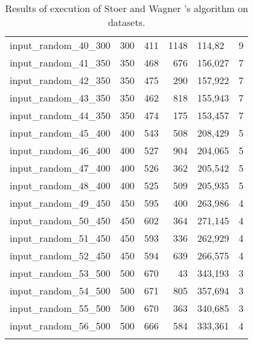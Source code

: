 \begin{longtable}{|l|r|r|r|l|r|}
    input\_random\_40\_300 & 300   & 411   & 1148  & 114,82    & 9     \\
    input\_random\_41\_350 & 350   & 468   & 676   & 156,027   & 7     \\
    input\_random\_42\_350 & 350   & 475   & 290   & 157,922   & 7     \\
    input\_random\_43\_350 & 350   & 462   & 818   & 155,943   & 7     \\
    input\_random\_44\_350 & 350   & 474   & 175   & 153,457   & 7     \\
    input\_random\_45\_400 & 400   & 543   & 508   & 208,429   & 5     \\
    input\_random\_46\_400 & 400   & 527   & 904   & 204,065   & 5     \\
    input\_random\_47\_400 & 400   & 526   & 362   & 205,542   & 5     \\
    input\_random\_48\_400 & 400   & 525   & 509   & 205,935   & 5     \\
    input\_random\_49\_450 & 450   & 595   & 400   & 263,986   & 4     \\
    input\_random\_50\_450 & 450   & 602   & 364   & 271,145   & 4     \\
    input\_random\_51\_450 & 450   & 593   & 336   & 262,929   & 4     \\
    input\_random\_52\_450 & 450   & 594   & 639   & 266,575   & 4     \\
    input\_random\_53\_500 & 500   & 670   & 43    & 343,193   & 3     \\
    input\_random\_54\_500 & 500   & 671   & 805   & 357,694   & 3     \\
    input\_random\_55\_500 & 500   & 670   & 363   & 340,685   & 3     \\
    input\_random\_56\_500 & 500   & 666   & 584   & 333,361   & 4     \\
    \hline
    \captionsetup{width=1.75\textwidth}
    \caption{Results of execution of Stoer and Wagner 's algorithm on datasets.}
\end{longtable}

